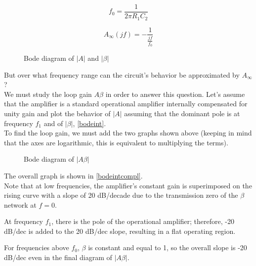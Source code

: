 \documentclass[../main.tex]{subfiles}
\begin{document}
\begin{equation}
	f_0 = \frac{1}{2\pi R_1C_2}
\end{equation}

\begin{equation}
	A_{\infty}(jf) = - \frac{1}{\frac{jf}{f_0}}
\end{equation}

\begin{figure}[h!]
\begin{center}

\label{bodeint}
\caption{Bode diagram of $|A|$ and $|\beta|$}	
\end{center}	
\end{figure}


But over what frequency range can the circuit’s behavior be approximated by $A_{\infty}$?\\

We must study the loop gain $A\beta$ in order to answer this question. Let’s assume that the amplifier is a standard operational amplifier internally compensated for unity gain and plot the behavior of $|A|$ assuming that the dominant pole is at frequency $f_1$ and of $|\beta|$, \autoref{bodeint}.\\

To find the loop gain, we must add the two graphs shown above (keeping in mind that the axes are logarithmic, this is equivalent to multiplying the terms).




\begin{figure}[h!]
\begin{center}

\label{bodeintcompl}
\caption{Bode diagram of $|A\beta|$}	
\end{center}	
\end{figure}


The overall graph is shown in \autoref{bodeintcompl}.\\ 

Note that at low frequencies, the amplifier’s constant gain is superimposed on the rising curve with a slope of 20 dB/decade due to the transmission zero of the $\beta$ network at $f = 0$.

At frequency $f_1$, there is the pole of the operational amplifier; therefore, -20 dB/dec is added to the 20 dB/dec slope, resulting in a flat operating region. 

For frequencies above $f_0$, $\beta$ is constant and equal to 1, so the overall slope is -20 dB/dec even in the final diagram of $|A\beta|$. 
\end{document}

